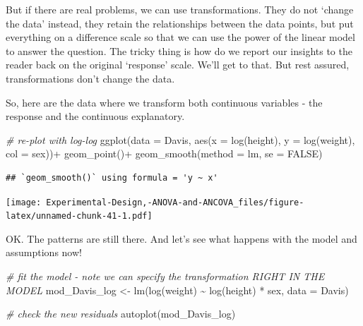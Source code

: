 \documentclass[
]{book}
\newenvironment{Shaded}{\begin{snugshade}}{\end{snugshade}}
\newcommand{\AttributeTok}[1]{\textcolor[rgb]{0.77,0.63,0.00}{#1}}
\newcommand{\CommentTok}[1]{\textcolor[rgb]{0.56,0.35,0.01}{\textit{#1}}}
\newcommand{\ConstantTok}[1]{\textcolor[rgb]{0.00,0.00,0.00}{#1}}
\newcommand{\FunctionTok}[1]{\textcolor[rgb]{0.00,0.00,0.00}{#1}}
\newcommand{\NormalTok}[1]{#1}
\newcommand{\OtherTok}[1]{\textcolor[rgb]{0.56,0.35,0.01}{#1}}
\newcommand{\SpecialCharTok}[1]{\textcolor[rgb]{0.00,0.00,0.00}{#1}}
\begin{document}
But if there are real problems, we can use transformations. They do not `change the data' instead, they retain the relationships between the data points, but put everything on a difference scale so that we can use the power of the linear model to answer the question. The tricky thing is how do we report our insights to the reader back on the original `response' scale. We'll get to that. But rest assured, transformations don't change the data.

So, here are the data where we transform both continuous variables - the response and the continuous explanatory.

\begin{Shaded}
\begin{Highlighting}[]
\CommentTok{\# re{-}plot with log{-}log}
\FunctionTok{ggplot}\NormalTok{(}\AttributeTok{data =}\NormalTok{ Davis, }\FunctionTok{aes}\NormalTok{(}\AttributeTok{x =} \FunctionTok{log}\NormalTok{(height), }\AttributeTok{y =} \FunctionTok{log}\NormalTok{(weight), }\AttributeTok{col =}\NormalTok{ sex))}\SpecialCharTok{+}
  \FunctionTok{geom\_point}\NormalTok{()}\SpecialCharTok{+}
  \FunctionTok{geom\_smooth}\NormalTok{(}\AttributeTok{method =}\NormalTok{ lm, }\AttributeTok{se =} \ConstantTok{FALSE}\NormalTok{)}
\end{Highlighting}
\end{Shaded}

\begin{verbatim}
## `geom_smooth()` using formula = 'y ~ x'
\end{verbatim}

\texttt{[image: Experimental-Design,-ANOVA-and-ANCOVA\_files/figure-latex/unnamed-chunk-41-1.pdf]}

OK. The patterns are still there. And let's see what happens with the model and assumptions now!

\begin{Shaded}
\begin{Highlighting}[]
\CommentTok{\# fit the model {-} note we can specify the transformation RIGHT IN THE MODEL}
\NormalTok{mod\_Davis\_log }\OtherTok{\textless{}{-}} \FunctionTok{lm}\NormalTok{(}\FunctionTok{log}\NormalTok{(weight) }\SpecialCharTok{\textasciitilde{}} \FunctionTok{log}\NormalTok{(height) }\SpecialCharTok{*}\NormalTok{ sex, }\AttributeTok{data =}\NormalTok{ Davis)}

\CommentTok{\# check the new residuals}
\FunctionTok{autoplot}\NormalTok{(mod\_Davis\_log)}
\end{Highlighting}
\end{Shaded}
\end{document}
